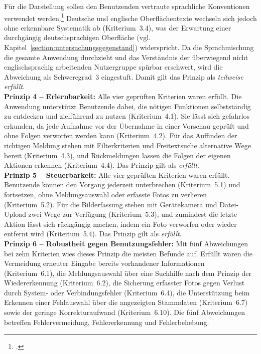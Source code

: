 Für die Darstellung sollen den Benutzenden vertraute sprachliche Konventionen
verwendet werden.\footcite[Vgl.][Abschnitt~5.3.3.1]{DIN_ISO_9241-110:2020}
Deutsche und englische Oberflächentexte wechseln sich jedoch ohne erkennbare
Systematik ab (Kriterium~3.4), was der Erwartung einer durchgängig
deutschsprachigen Oberfläche
(vgl. Kapitel~\ref{section:untersuchungsgegenstand}) widerspricht.
Da die Sprachmischung die gesamte Anwendung durchzieht und das Verständnis der
überwiegend nicht englischsprachig arbeitenden Nutzergruppe spürbar erschwert,
wird die Abweichung als Schweregrad~3 eingestuft.
Damit gilt das Prinzip als \emph{teilweise erfüllt}.\\
\textbf{Prinzip 4 -- Erlernbarkeit:}
Alle vier geprüften Kriterien waren erfüllt.
Die Anwendung unterstützt Benutzende dabei, die nötigen Funktionen selbstständig
zu entdecken und zielführend zu nutzen (Kriterium~4.1).
Sie lässt sich gefahrlos erkunden, da jede Aufnahme vor der Übernahme in einer
Vorschau geprüft und ohne Folgen verworfen werden kann (Kriterium~4.2).
Für das Auffinden der richtigen Meldung stehen mit Filterkriterien und
Freitextsuche alternative Wege bereit (Kriterium~4.3), und Rückmeldungen lassen
die Folgen der eigenen Aktionen erkennen (Kriterium~4.4).
Das Prinzip gilt als \emph{erfüllt}.\\
\textbf{Prinzip 5 -- Steuerbarkeit:}
Alle vier geprüften Kriterien waren erfüllt.
Benutzende können den Vorgang jederzeit unterbrechen (Kriterium~5.1) und
fortsetzen, ohne Meldungsauswahl oder erfasste Fotos zu verlieren (Kriterium~5.2).
Für die Bilderfassung stehen mit Gerätekamera und Datei-Upload zwei Wege zur
Verfügung (Kriterium~5.3), und zumindest die letzte Aktion lässt sich rückgängig
machen, indem ein Foto verworfen oder wieder entfernt wird (Kriterium~5.4).
Das Prinzip gilt als \emph{erfüllt}.\\
\textbf{Prinzip 6 -- Robustheit gegen Benutzungsfehler:}
Mit fünf Abweichungen bei zehn Kriterien wies dieses Prinzip die meisten Befunde
auf.
Erfüllt waren die Vermeidung erneuter Eingabe bereits vorhandener Informationen
(Kriterium~6.1), die Meldungsauswahl über eine Suchhilfe nach dem Prinzip der
Wiedererkennung (Kriterium~6.2), die Sicherung erfasster Fotos gegen Verlust
durch System- oder Verbindungsfehler (Kriterium~6.4), die Unterstützung beim
Erkennen einer Fehlauswahl über die angezeigten Stammdaten (Kriterium~6.7) sowie
der geringe Korrekturaufwand (Kriterium~6.10).
Die fünf Abweichungen betreffen Fehlervermeidung, Fehlererkennung und
Fehlerbehebung.

